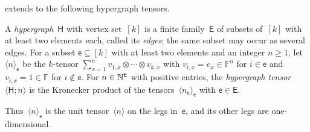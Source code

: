 \documentclass[11pt,letterpaper]{article}
\newcommand{\FF}{\mathbb{F}}
\newcommand{\NN}{\mathbb{N}}
\begin{document}
 extends to the following hypergraph tensors.

\begin{definition}\label{def:hypergraph-tensor}
A \emph{hypergraph}~$\mathsf{H}$ with vertex set~$[k]$ is a finite family~$\mathsf{E}$ of subsets of~$[k]$ with at least two elements each, called its \emph{edges}; the same subset may occur as several edges. For a subset $\mathsf{e} \subseteq [k]$ with at least two elements and an integer $n \geq 1$, let~$\langle n \rangle_{\mathsf{e}}$ be the $k$-tensor $\sum_{x=1}^n v_{1,x} \otimes \cdots \otimes v_{k,x}$ with $v_{i,x} = e_x \in \FF^n$ for $i \in \mathsf{e}$ and $v_{i,x} = 1 \in \FF$ for $i \notin \mathsf{e}$. For $n \in \NN^{\smash{\mathsf{E}}}$ with positive entries, the \emph{hypergraph tensor} $\langle \mathsf{H}; n \rangle$ is the Kronecker product of the tensors~$\langle n_{\mathsf{e}} \rangle_{\mathsf{e}}$ with $\mathsf{e} \in \mathsf{E}$.
\end{definition}

Thus~$\langle n \rangle_{\mathsf{e}}$ is the unit tensor~$\langle n \rangle$ on the legs in~$\mathsf{e}$, and its other legs are one-dimensional.
\end{document}
